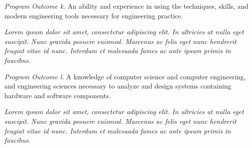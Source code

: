 \documentclass[letterpaper]{kuthesis}
\begin{document}
\textit{Program Outcome k.}  An ability and experience in using the techniques, skills, and modern engineering tools necessary for engineering practice.
\begin{adjustwidth}{0.5in}{0in}
\textit{Lorem ipsum dolor sit amet, consectetur adipiscing elit. In ultricies at nulla eget suscipit. Nunc gravida posuere euismod. Maecenas ac felis eget nunc hendrerit feugiat vitae id nunc. Interdum et malesuada fames ac ante ipsum primis in faucibus. }\\
\end{adjustwidth}
\textit{Program Outcome l.}  A knowledge of computer science and computer engineering, and engineering sciences necessary to analyze and design systems containing hardware and software components.
\begin{adjustwidth}{0.5in}{0in}
\textit{Lorem ipsum dolor sit amet, consectetur adipiscing elit. In ultricies at nulla eget suscipit. Nunc gravida posuere euismod. Maecenas ac felis eget nunc hendrerit feugiat vitae id nunc. Interdum et malesuada fames ac ante ipsum primis in faucibus. }\\
\end{adjustwidth}
\end{document}
